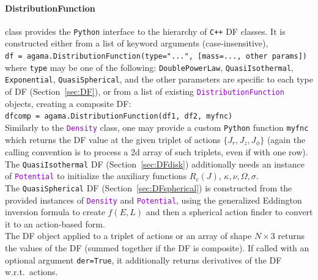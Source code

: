 \documentclass[12pt]{article}
\newcommand{\Cpp}  {\texttt{C++}\xspace}
\newcommand{\Python}{\texttt{Python}\xspace}
\newcommand{\ttt}[1]{\textcolor{darkviolet}{\texttt{#1}}}
\newcommand{\ppp}[1]{\textcolor{darkolive} {\texttt{#1}}}
\let\oldparagraph\paragraph
\renewcommand{\paragraph}[1]{\vspace{-2mm}\oldparagraph{#1}}
\begin{document}
\paragraph{DistributionFunction} class provides the \Python interface to the hierarchy of \Cpp DF classes. It is constructed either from a list of keyword arguments (case-insensitive),\\[1mm]
\texttt{df = agama.DistributionFunction(type="...", [mass=..., other params])}\\[1mm]
where \ppp{type} may be one of the following: \ppp{DoublePowerLaw}, \ppp{QuasiIsothermal}, \ppp{Exponential}, \ppp{QuasiSpherical}, and the other parameters are specific to each type of DF (Section~\ref{sec:DF}),
or from a list of existing \ttt{DistributionFunction} objects, creating a composite DF:\\[1mm]
\texttt{dfcomp = agama.DistributionFunction(df1, df2, myfnc)}
\\[2mm]
Similarly to the \ttt{Density} class, one may provide a custom \Python function \texttt{myfnc} which returns the DF value at the given triplet of actions $\{J_r,J_z,J_\phi\}$ (again the calling convention is to process a 2d array of such triplets, even if with one row).
\\[2mm]
The \ppp{QuasiIsothermal} DF (Section~\ref{sec:DFdisk}) additionally needs an instance of \ttt{Potential} to initialize the auxiliary functions $R_c(J)$, $\kappa,\nu,\Omega,\sigma$.
\\[2mm]
The \ppp{QuasiSpherical} DF (Section~\ref{sec:DFspherical}) is constructed from the provided instances of \ttt{Density} and \ttt{Potential}, using the generalized Eddington inversion formula to create $f(E,L)$ and then a spherical action finder to convert it to an action-based form.\\[2mm]
The DF object applied to a triplet of actions or an array of shape $N\times3$ returns the values of the DF (summed together if the DF is composite). If called with an optional argument \texttt{der=True}, it additionally returns derivatives of the DF w.r.t.\ actions.
\end{document}
